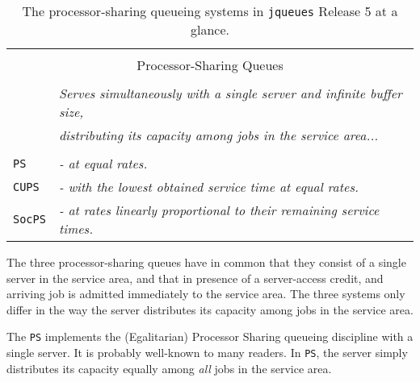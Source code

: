 \begin{table}[!htbp]
	\label{tab:processor-sharing-queues}
	\caption{The processor-sharing queueing systems
             in \texttt{jqueues} Release 5
             at a glance.}
	\begin{center}
		\begin{tabular}{|l|l|}
			\hline
			\multicolumn{2}{|c|}{} \\
			\multicolumn{2}{|c|}{Processor-Sharing Queues} \\
			\multicolumn{2}{|c|}{} \\
			\hline
            \hline
              &
              {\em Serves simultaneously with a single server and infinite buffer size,}
              \\
              &
              {\em distributing its capacity among jobs in the service area...}
              \\
              &
              \\
			\lstinline|PS|
              &
              {\em - at equal rates.}
              \\
			\lstinline|CUPS|
              &
              {\em - with the lowest obtained service time at equal rates.}
              \\
			\lstinline|SocPS|
              &
              {\em - at rates linearly proportional to their remaining service times.}
              \\
            \hline
		\end{tabular}
	\end{center}
\end{table}

The three processor-sharing queues
  have in common that they consist
  of a single server in the service area,
  and that in presence of a server-access credit,
  and arriving job is admitted immediately to
  the service area.
The three systems only differ in the way
  the server distributes its capacity
  among jobs in the service area.

The \lstinline|PS| implements
  the (Egalitarian) Processor Sharing
  queueing discipline
  with a single server.
It is probably well-known to many readers.
In \lstinline|PS|,
  the server simply distributes its capacity equally
  among {\em all\/} jobs in the service area.

